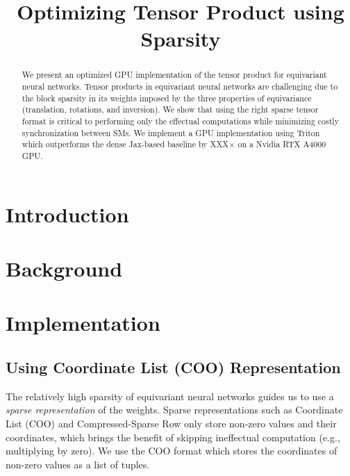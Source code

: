 \documentclass[conference]{IEEEtran}
\begin{document}
\title{Optimizing Tensor Product using Sparsity}

\author{
\and
{}
\and
{}
}

\maketitle

\begin{abstract}
We present an optimized GPU implementation of the tensor product for equivariant neural networks. Tensor products in equivariant neural networks are challenging due to the block sparsity in its weights imposed by the three properties of equivariance (translation, rotations, and inversion). We show that using the right sparse tensor format is critical to performing only the effectual computations while minimizing costly synchronization between SMs. We implement a GPU implementation using Triton which outperforms the dense Jax-based baseline by XXX$\times$ on a Nvidia RTX A4000 GPU.
\end{abstract}


\section{Introduction}
\label{sec:intro}

\section{Background}
\label{sec:background}

\section{Implementation}
\label{sec:impl}

\subsection{Using Coordinate List (COO) Representation}
\label{sec:impl:coo}

The relatively high sparsity of equivariant neural networks guides us to use a \textit{sparse representation} of the weights. Sparse representations such as Coordinate List (COO) and Compressed-Sparse Row only store non-zero values and their coordinates,
which brings the benefit of skipping ineffectual computation (e.g., multiplying by zero). We use the COO format which stores the coordinates of non-zero values as a list of tuples.
\end{document}
